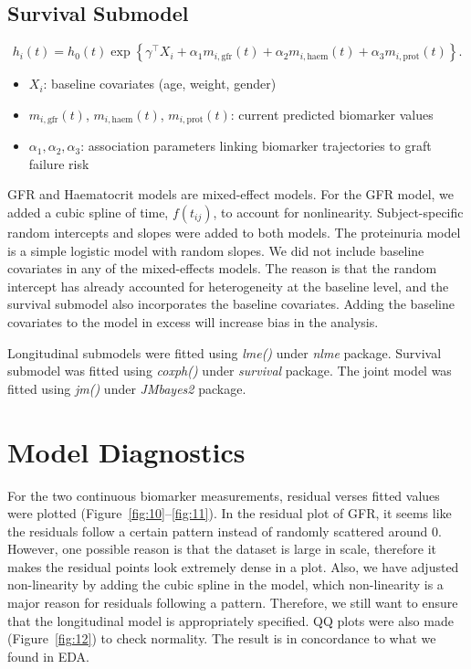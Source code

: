 \documentclass[11pt]{article}
\begin{document}
\subsection*{Survival Submodel}
\[
h_i(t) = h_0(t)\exp\left\{
\gamma^\top X_i
+ \alpha_1 m_{i,\mathrm{gfr}}(t)
+ \alpha_2 m_{i,\mathrm{haem}}(t)
+ \alpha_3 m_{i,\mathrm{prot}}(t)
\right\}.
\]

\begin{itemize}
\item $X_i$: baseline covariates (age, weight, gender)

\item $m_{i,\mathrm{gfr}}(t)$, $m_{i,\mathrm{haem}}(t)$, $m_{i,\mathrm{prot}}(t)$: current predicted biomarker values

\item $\alpha_1, \alpha_2, \alpha_3$: association parameters linking biomarker trajectories to graft failure risk
\end{itemize}

GFR and Haematocrit models are mixed-effect models. For the GFR model, we added a cubic spline of time, $f(t_{ij})$, to account for nonlinearity. Subject-specific random intercepts and slopes were added to both models. The proteinuria model is a simple logistic model with random slopes. We did not include baseline covariates in any of the mixed-effects models. The reason is that the random intercept has already accounted for heterogeneity at the baseline level, and the survival submodel also incorporates the baseline covariates. Adding the baseline covariates to the model in excess will increase bias in the analysis. 

Longitudinal submodels were fitted using \textit{lme()} under \textit{nlme} package. Survival submodel was fitted using \textit{coxph()} under \textit{survival} package. The joint model was fitted using \textit{jm()} under \textit{JMbayes2} package.

\section{Model Diagnostics}
For the two continuous biomarker measurements, residual verses fitted values were plotted (Figure~\ref{fig:10}--\ref{fig:11}). In the residual plot of GFR, it seems like the residuals follow a certain pattern instead of randomly scattered around 0. However, one possible reason is that the dataset is large in scale, therefore it makes the residual points look extremely dense in a plot. Also, we have adjusted non-linearity by adding the cubic spline in the model, which non-linearity is a major reason for residuals following a pattern. Therefore, we still want to ensure that the longitudinal model is appropriately specified. QQ plots were also made (Figure~\ref{fig:12}) to check normality. The result is in concordance to what we found in EDA.
\end{document}
